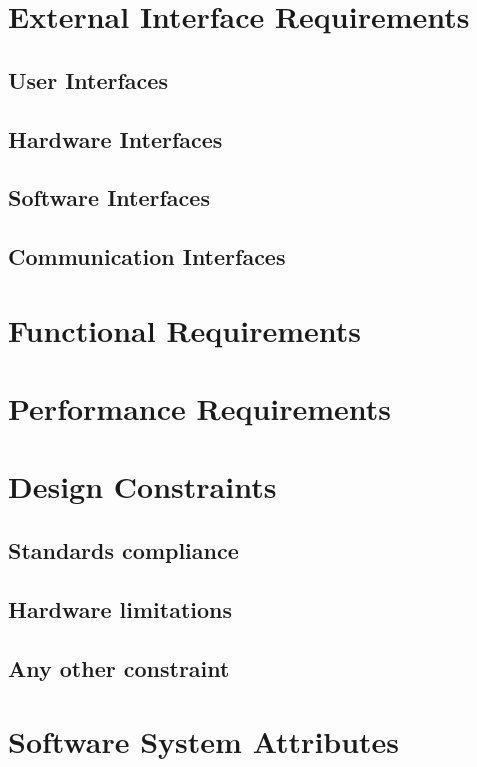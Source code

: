 \section{External Interface Requirements}
\label{sec:External Interface Requirements}%

\subsection{User Interfaces}
\subsection{Hardware Interfaces}
\subsection{Software Interfaces}
\subsection{Communication Interfaces}

\section{Functional Requirements}
\label{sec:Functional Requirements}%

\section{Performance Requirements}
\label{sec:Performance Requirements}%

\section{Design Constraints}
\label{sec:Design Constraints}%

\subsection{Standards compliance}
\subsection{Hardware limitations}
\subsection{Any other constraint}

\section{Software System Attributes}
\label{sec:Software System Attributes}%

